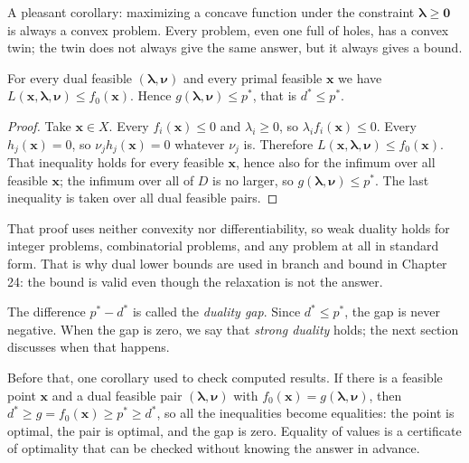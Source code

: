 A pleasant corollary: maximizing a concave function under the constraint
$\boldsymbol{\lambda}\ge\mathbf{0}$ is always a convex problem. Every problem, even one full of
holes, has a convex twin; the twin does not always give the same answer, but it always gives a
bound.

\begin{teorema}
For every dual feasible $(\boldsymbol{\lambda},\boldsymbol{\nu})$ and every primal feasible
$\mathbf{x}$ we have $L(\mathbf{x},\boldsymbol{\lambda},\boldsymbol{\nu})\le
f_{0}(\mathbf{x})$. Hence $g(\boldsymbol{\lambda},\boldsymbol{\nu})\le p^{*}$, that is
$d^{*}\le p^{*}$.
\end{teorema}

\begin{proof}
Take $\mathbf{x}\in X$. Every $f_{i}(\mathbf{x})\le0$ and $\lambda_{i}\ge0$, so
$\lambda_{i}f_{i}(\mathbf{x})\le0$. Every $h_{j}(\mathbf{x})=0$, so
$\nu_{j}h_{j}(\mathbf{x})=0$ whatever $\nu_{j}$ is. Therefore
$L(\mathbf{x},\boldsymbol{\lambda},\boldsymbol{\nu})\le f_{0}(\mathbf{x})$. That inequality
holds for every feasible $\mathbf{x}$, hence also for the infimum over all feasible
$\mathbf{x}$; the infimum over all of $D$ is no larger, so
$g(\boldsymbol{\lambda},\boldsymbol{\nu})\le p^{*}$. The last inequality is taken over all
dual feasible pairs.
\end{proof}

That proof uses neither convexity nor differentiability, so weak duality holds for integer
problems, combinatorial problems, and any problem at all in standard form. That is why dual
lower bounds are used in branch and bound in Chapter 24: the bound is valid even though the
relaxation is not the answer.

The difference $p^{*}-d^{*}$ is called the \emph{duality gap}. Since
$d^{*}\le p^{*}$, the gap is never negative. When the gap is zero, we say that
\emph{strong duality} holds; the next section discusses when that happens.

Before that, one corollary used to check computed results. If there is a feasible point
$\mathbf{x}$ and a dual feasible pair $(\boldsymbol{\lambda},\boldsymbol{\nu})$ with
$f_{0}(\mathbf{x})=g(\boldsymbol{\lambda},\boldsymbol{\nu})$, then
$d^{*}\ge g=f_{0}(\mathbf{x})\ge p^{*}\ge d^{*}$, so all the inequalities become equalities:
the point is optimal, the pair is optimal, and the gap is zero. Equality of values is a
certificate of optimality that can be checked without knowing the answer in advance.

